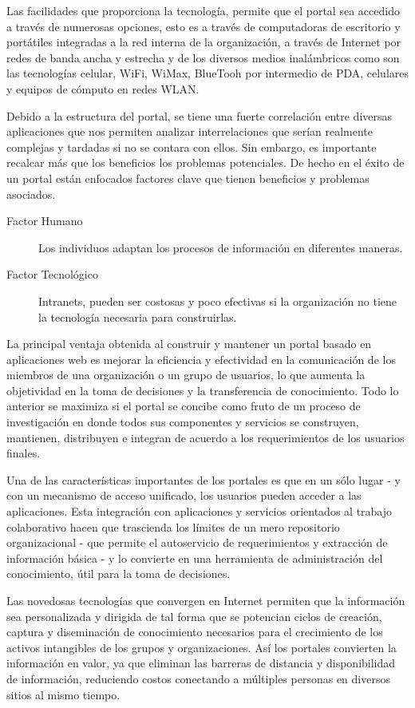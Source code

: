 Las facilidades que proporciona la tecnología, permite que el portal sea accedido a través de numerosas opciones, esto es a través de computadoras de escritorio y portátiles integradas a la red interna de la organización, a través de Internet por redes de banda ancha y estrecha y de los diversos medios inalámbricos como son las tecnologías celular, WiFi, WiMax, BlueTooh por intermedio de PDA, celulares y equipos de cómputo en redes WLAN.

Debido a la estructura del portal, se tiene una fuerte correlación entre diversas aplicaciones que nos permiten analizar interrelaciones que serían realmente complejas y tardadas si no se contara con ellos. Sin embargo, es importante recalcar más que los beneficios los problemas potenciales. De hecho en el éxito de un portal están enfocados factores clave que tienen beneficios y problemas asociados.

\begin{description}
 \item[Factor Humano] Los individuos adaptan los procesos de información en diferentes maneras. 
 \item[Factor Tecnológico] Intranets, pueden ser costosas y poco efectivas si la organización no tiene la tecnología necesaria para construirlas.
 \end{description} 

La principal ventaja obtenida al construir y mantener un portal basado en aplicaciones web es mejorar la eficiencia y efectividad en la comunicación de los miembros de una organización o un grupo de usuarios, lo que aumenta la objetividad en la toma de decisiones y la transferencia de conocimiento. Todo lo anterior se maximiza si el portal se concibe como fruto de un proceso de investigación en donde todos sus componentes y servicios se construyen, mantienen, distribuyen e integran de acuerdo a los requerimientos de los usuarios finales\cite{sarmento2005}.

Una de las características importantes de los portales es que en un sólo lugar - y con un mecanismo de acceso unificado, los usuarios pueden acceder a las aplicaciones. Esta integración con aplicaciones y servicios orientados al trabajo colaborativo hacen que trascienda los límites de un mero repositorio organizacional - que permite el autoservicio de requerimientos y extracción de información básica - y lo convierte en una herramienta de administración del conocimiento, útil para la toma de decisiones.

Las novedosas tecnologías que convergen en Internet permiten que la información sea personalizada y dirigida de tal forma que se potencian ciclos de creación, captura y diseminación de conocimiento necesarios para el crecimiento de los activos intangibles de los grupos y organizaciones. Así los portales convierten la información en valor, ya que eliminan las barreras de distancia y disponibilidad de información, reduciendo costos conectando a múltiples personas en diversos sitios al mismo tiempo.

